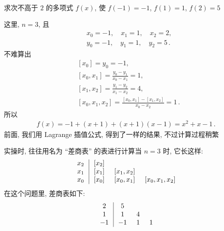 \begin{example}
    求次不高于 $2$ 的多项式 $f(x)$, 使 $f(-1)=-1$, $f(1)=1$, $f(2)=5$\period

    这里, $n = 3$, 且
    \begin{align*}
         & x_0 = -1, \quad x_1 = 1, \quad x_2 = 2,        \\
         & y_0 = -1, \quad y_1 = 1, \quad y_2 = 5 \period
    \end{align*}
    不难算出
    \begin{align*}
         & [x_0] = y_0 = -1,                                \\
         & [x_0, x_1] = \frac{y_0 - y_1}{x_0 - x_1}
        = 1,                                                \\
         & [x_1, x_2] = \frac{y_1 - y_2}{x_1 - x_2}
        = 4,                                                \\
         & [x_0, x_1, x_2] = \frac{[x_0, x_1] - [x_1, x_2]}
        {x_0 - x_2} = 1 \period
    \end{align*}
    所以
    \begin{align*}
        f(x) = -1 + (x + 1) + (x + 1)(x - 1) = x^2 + x - 1 \period
    \end{align*}
    前面, 我们用 Lagrange 插值公式, 得到了一样的结果, 不过计算过程稍繁\period

    实操时, 往往用名为 ``差商表'' 的表进行计算\period 当 $n = 3$ 时, 它长这样:
    \begin{align*}
        \arraycolsep=0.25cm
        \begin{array}{c|ccc}
            x_2 & [x_2] & \          & \               \\
            x_1 & [x_1] & [x_1, x_2] & \               \\
            x_0 & [x_0] & [x_0, x_1] & [x_0, x_1, x_2] \\
        \end{array}
    \end{align*}
    在这个问题里, 差商表如下:
    \begin{align*}
        \arraycolsep=0.25cm
        \begin{array}{c|ccc}
            2  & 5  & \  & \ \\
            1  & 1  & 4  & \ \\
            -1 & -1 & 1  & 1 \\
        \end{array}
    \end{align*}
\end{example}

